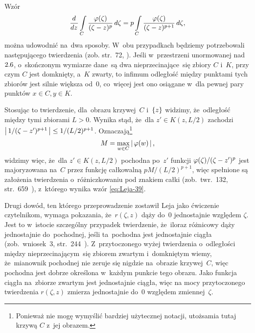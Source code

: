 \documentclass[a4paper,11pt]{article}
\begin{document}
\vspace{\spaceFour}


\start {} Wzór
\begin{equation}
  \label{eq:Leja-39}
  \frac{ d^{   } {   } }{ d {  z  }^{   } } \int\limits_{ C } \frac{ \varphi( \zeta ) }{ ( \zeta - z )^{ p } }\,
  d\zeta
  = p \int\limits_{ C } \frac{ \varphi( \zeta ) }{ ( \zeta - z )^{ p + 1 } }\, d\zeta,
\end{equation}
można udowodnić na~dwa sposoby. W~obu przypadkach będziemy
potrzebowali następującego twierdzenia (zob. str.~72,
\cite{SchwartzKursAnalizyMatematycznejTomI1979}). Jeśli w~przestrzeni
unormowanej nad~$2.6$, o~skończonym wymiarze dane~są dwa
nieprzecinające~się zbiory $C$ i~$K$, przy czym $C$ jest domknięty,
a~$K$ zwarty, to infimum odległość między punktami tych zbiorów jest
silnie większa od~$0$, co~więcej jest ono osiągane w~dla pewnej pary
punktów $x \in C, y \in K$.

Stosując to twierdzenie, dla~obrazu krzywej~$C$ i~$\{  z  \}$ widzimy,
że~odległość między tymi zbiorami $L > 0$. Wynika stąd, że~dla
$z' \in K( z, L / 2 )$ zachodzi
$\left| \,  1 / ( \zeta - z' )^{ p + 1 }  \, \right| \leq 1 / ( L / 2 )^{ p + 1 }$.
Oznaczają\footnote{Ponieważ nie mogę wymyślić bardziej użytecznej
  notacji, utożsamia tutaj krzywą $C$ z~jej obrazem.}
\begin{equation}
  \label{eq:Leja-40}
  M = \max_{ w \in C } \left| \,  \varphi( w )  \, \right|,
\end{equation}
widzimy więc, że~dla $z' \in K( z, L / 2 )$ pochodna po~$z'$ funkcji
$\varphi( \zeta ) / ( \zeta - z' )^{ p }$ jest majoryzowana na~$C$ przez
funkcję całkowalną $p M / ( L / 2 )^{ p + 1 }$, więc spełnione są
założenia twierdzenia o~różniczkowaniu pod znakiem całki
(zob.~twr.~132,
str.~659~\cite{SchwartzKursAnalizyMatematycznejTomI1979}), z~którego
wynika wzór \eqref{eq:Leja-39}.

Drugi dowód, ten którego przeprowadzenie zostawił Leja jako ćwiczenie
czytelnikom, wymaga pokazania, że~$r( \zeta, z )$ dąży do~$0$
jednostajnie względem $\zeta$. Jest to w~istocie szczególny przypadek
twierdzenie, że~iloraz różnicowy dąży jednostajnie do~pochodnej, jeśli
ta~pochodna jest jednostajnie ciągła (zob.~wniosek~3,
str.~244~\cite{SchwartzKursAnalizyMatematycznejTomI1979}).
Z~przytoczonego wyżej twierdzenia o~odległości między
nieprzecinającym~się zbiorem zwartym i~domkniętym wiemy, że~mianownik
pochodnej nie zeruje się nigdzie na~obrazie krzywej~$C$, więc pochodna
jest dobrze określona w~każdym punkcie tego obrazu. Jako funkcja
ciągła na~zbiorze zwartym jest jednostajnie ciągła, więc na mocy
przytoczonego twierdzenia $r( \zeta, z )$ zmierza jednostajnie do~$0$
względem zmiennej~$\zeta$.
\end{document}
